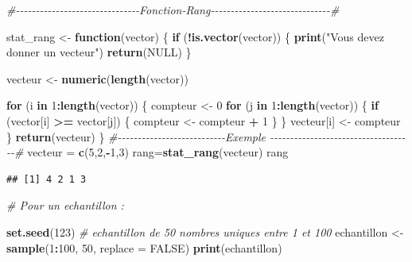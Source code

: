 \documentclass[
  12pt,
]{article}
\newenvironment{Shaded}{\begin{snugshade}}{\end{snugshade}}
\newcommand{\AttributeTok}[1]{\textcolor[rgb]{0.13,0.29,0.53}{#1}}
\newcommand{\CommentTok}[1]{\textcolor[rgb]{0.56,0.35,0.01}{\textit{#1}}}
\newcommand{\ConstantTok}[1]{\textcolor[rgb]{0.56,0.35,0.01}{#1}}
\newcommand{\ControlFlowTok}[1]{\textcolor[rgb]{0.13,0.29,0.53}{\textbf{#1}}}
\newcommand{\DecValTok}[1]{\textcolor[rgb]{0.00,0.00,0.81}{#1}}
\newcommand{\FunctionTok}[1]{\textcolor[rgb]{0.13,0.29,0.53}{\textbf{#1}}}
\newcommand{\NormalTok}[1]{#1}
\newcommand{\OtherTok}[1]{\textcolor[rgb]{0.56,0.35,0.01}{#1}}
\newcommand{\SpecialCharTok}[1]{\textcolor[rgb]{0.81,0.36,0.00}{\textbf{#1}}}
\newcommand{\StringTok}[1]{\textcolor[rgb]{0.31,0.60,0.02}{#1}}
\begin{document}
\begin{Shaded}
\begin{Highlighting}[]
\CommentTok{\#{-}{-}{-}{-}{-}{-}{-}{-}{-}{-}{-}{-}{-}{-}{-}{-}{-}{-}{-}{-}{-}{-}{-}{-}{-}{-}{-}{-}{-}{-}{-}Fonction{-}Rang{-}{-}{-}{-}{-}{-}{-}{-}{-}{-}{-}{-}{-}{-}{-}{-}{-}{-}{-}{-}{-}{-}{-}{-}{-}{-}{-}{-}{-}{-}\#}

\NormalTok{stat\_rang }\OtherTok{\textless{}{-}} \ControlFlowTok{function}\NormalTok{(vector) \{}
  \ControlFlowTok{if}\NormalTok{ (}\SpecialCharTok{!}\FunctionTok{is.vector}\NormalTok{(vector)) \{}
    \FunctionTok{print}\NormalTok{(}\StringTok{"Vous devez donner un vecteur"}\NormalTok{)}
    \FunctionTok{return}\NormalTok{(}\ConstantTok{NULL}\NormalTok{)  }
\NormalTok{  \}}
  
\NormalTok{  vecteur }\OtherTok{\textless{}{-}} \FunctionTok{numeric}\NormalTok{(}\FunctionTok{length}\NormalTok{(vector)) }
  
  \ControlFlowTok{for}\NormalTok{ (i }\ControlFlowTok{in} \DecValTok{1}\SpecialCharTok{:}\FunctionTok{length}\NormalTok{(vector)) \{}
\NormalTok{    compteur }\OtherTok{\textless{}{-}} \DecValTok{0}  
    \ControlFlowTok{for}\NormalTok{ (j }\ControlFlowTok{in} \DecValTok{1}\SpecialCharTok{:}\FunctionTok{length}\NormalTok{(vector)) \{}
      \ControlFlowTok{if}\NormalTok{ (vector[i] }\SpecialCharTok{\textgreater{}=}\NormalTok{ vector[j]) \{}
\NormalTok{        compteur }\OtherTok{\textless{}{-}}\NormalTok{ compteur }\SpecialCharTok{+} \DecValTok{1}
\NormalTok{      \}}
\NormalTok{    \}}
\NormalTok{    vecteur[i] }\OtherTok{\textless{}{-}}\NormalTok{ compteur  }
\NormalTok{  \}}
  \FunctionTok{return}\NormalTok{(vecteur)  }
\NormalTok{\} }
\CommentTok{\#{-}{-}{-}{-}{-}{-}{-}{-}{-}{-}{-}{-}{-}{-}{-}{-}{-}{-}{-}{-}{-}{-}{-}{-}{-}{-}{-}Exemple {-}{-}{-}{-}{-}{-}{-}{-}{-}{-}{-}{-}{-}{-}{-}{-}{-}{-}{-}{-}{-}{-}{-}{-}{-}{-}{-}{-}{-}{-}{-}{-}{-}{-}{-}{-}\#}
\NormalTok{vecteur }\OtherTok{=} \FunctionTok{c}\NormalTok{(}\DecValTok{5}\NormalTok{,}\DecValTok{2}\NormalTok{,}\SpecialCharTok{{-}}\DecValTok{1}\NormalTok{,}\DecValTok{3}\NormalTok{) }
\NormalTok{rang}\OtherTok{=}\FunctionTok{stat\_rang}\NormalTok{(vecteur)}
\NormalTok{rang}
\end{Highlighting}
\end{Shaded}

\begin{verbatim}
## [1] 4 2 1 3
\end{verbatim}

\begin{Shaded}
\begin{Highlighting}[]
\CommentTok{\# Pour un echantillon : }

\FunctionTok{set.seed}\NormalTok{(}\DecValTok{123}\NormalTok{) }
 \CommentTok{\# echantillon de 50 nombres uniques entre 1 et 100}
\NormalTok{echantillon }\OtherTok{\textless{}{-}} \FunctionTok{sample}\NormalTok{(}\DecValTok{1}\SpecialCharTok{:}\DecValTok{100}\NormalTok{, }\DecValTok{50}\NormalTok{, }\AttributeTok{replace =} \ConstantTok{FALSE}\NormalTok{) }
\FunctionTok{print}\NormalTok{(echantillon)}
\end{Highlighting}
\end{Shaded}
\end{document}

